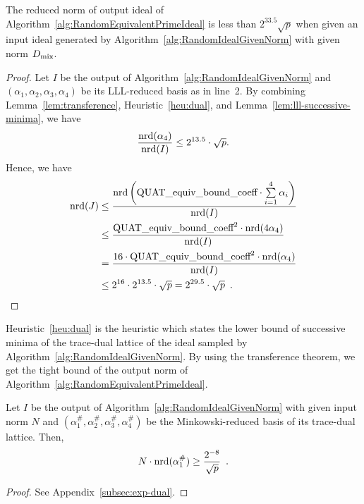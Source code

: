 \begin{lemma}
\label{lem:RandomEquivalentPrimeIdeal-bound}
The reduced norm of output ideal of Algorithm~\ref{alg:RandomEquivalentPrimeIdeal} is less than $2^{33.5}\sqrt{p}$ when given an input ideal generated by Algorithm~\ref{alg:RandomIdealGivenNorm} with given norm $D_\text{mix}$.
\end{lemma}

\begin{proof}
Let $I$ be the output of Algorithm~\ref{alg:RandomIdealGivenNorm} and $(\alpha_1,\alpha_2,\alpha_3,\alpha_4)$ be its LLL-reduced basis as in line~2.
By combining Lemma~\ref{lem:transference}, Heuristic~\ref{heu:dual}, and Lemma~\ref{lem:lll-successive-minima}, we have
\[ \frac{\mathrm{nrd}(\alpha_4)}{\mathrm{nrd}(I)} \le 2^{13.5}\cdot\sqrt{p}. \]
Hence, we have
\begin{align*}
    \mathrm{nrd}(J)
    &\le \frac{\mathrm{nrd}\left(\text{QUAT\_equiv\_bound\_coeff}\cdot\sum\limits_{i=1}^{4} \alpha_i\right) }{\mathrm{nrd}(I)}\\
    &\le \frac{\text{QUAT\_equiv\_bound\_coeff}^2\cdot\mathrm{nrd}(4\alpha_4)}{\mathrm{nrd}(I)}\\
    &= \frac{16\cdot\text{QUAT\_equiv\_bound\_coeff}^2\cdot\mathrm{nrd}(\alpha_4)}{\mathrm{nrd}(I)}\\
    &\le 2^{16}\cdot2^{13.5}\cdot\sqrt{p} = 2^{29.5}\cdot\sqrt{p}
    \enspace .
\end{align*}
\end{proof}

Heuristic~\ref{heu:dual} is the heuristic which states the lower bound of successive minima of the trace-dual lattice of the ideal sampled by Algorithm~\ref{alg:RandomIdealGivenNorm}.
By using the transference theorem, we get the tight bound of the output norm of Algorithm~\ref{alg:RandomEquivalentPrimeIdeal}.

\begin{heuristic}
\label{heu:dual}
Let $I$ be the output of Algorithm~\ref{alg:RandomIdealGivenNorm} with given input norm $N$ and $(\alpha^\#_1,\alpha^\#_2,\alpha^\#_3,\alpha^\#_4)$ be the Minkowski-reduced basis of its trace-dual lattice.
Then, \[N\cdot\mathrm{nrd}(\alpha^\#_1) \ge \frac{2^{-8}}{\sqrt{p}}\enspace.\]
\end{heuristic}

\begin{proof}
See Appendix~\ref{subsec:exp-dual}.
\end{proof}


